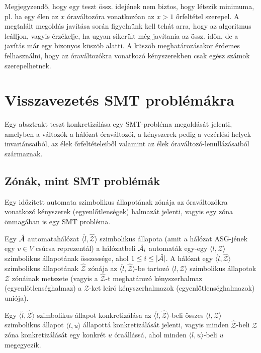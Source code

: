 Megjegyzendő, hogy egy teszt össz. idejének nem biztos, hogy létezik minimuma, pl. ha egy élen az $x$ óraváltozóra vonatkozóan az $x > 1$ őrfeltétel szerepel. A megtalált megoldás javítása során figyelnünk kell tehát arra, hogy az algoritmus leálljon, vagyis érzékelje, ha ugyan sikerült még javítania az össz. időn, de a javítás már egy bizonyos küszöb alatti. A küszöb meghatározásakor érdemes felhasználni, hogy az óraváltozókra vonatkozó kényszerekben csak egész számok szerepelhetnek.

\section{Visszavezetés SMT problémákra} \label{teszt-smt}

Egy absztrakt teszt konkretizálása egy SMT-probléma megoldását jelenti, amelyben a változók a hálózat óraváltozói, a kényszerek pedig a vezérlési helyek invariánsaiból, az élek őrfeltételeiből valamint az élek óraváltozó-lenullázásaiból származnak.

\subsection{Zónák, mint SMT problémák}

Egy időzített automata szimbolikus állapotának zónája az óraváltozókra vonatkozó kényszerek (egyenlőtlenségek) halmazát jelenti, vagyis egy zóna önmagában is egy SMT probléma.

Egy $\hat{\mathcal{A}}$ automatahálózat $\langle \hat{l}, \hat{\mathcal{Z}} \rangle$ szimbolikus állapota (amit a hálózat ASG-jének egy $v \in V$ csúcsa reprezentál) a hálózatbeli $\hat{\mathcal{A}}_i$ automaták egy-egy $\langle l, \mathcal{Z} \rangle$ szimbolikus állapotának összessége, ahol $1 \leq i \leq |\hat{\mathcal{A}}|$. A hálózat egy $\langle \hat{l}, \hat{\mathcal{Z}} \rangle$ szimbolikus állapotának $\hat{\mathcal{Z}}$ zónája az $\langle \hat{l}, \hat{\mathcal{Z}} \rangle$-be tartozó $\langle l, \mathcal{Z} \rangle$ szimbolikus állapotok $\mathcal{Z}$ zónáinak metszete (vagyis a $\hat{\mathcal{Z}}$-t meghatározó kényszerhalmaz (egyenlőtlenséghalmaz) a $\mathcal{Z}$-ket leíró kényszerhalmazok (egyenlőtlenséghalmazok) uniója).

Egy $\langle \hat{l}, \hat{\mathcal{Z}} \rangle$ szimbolikus állapot konkretizálása az $\langle \hat{l}, \hat{\mathcal{Z}} \rangle$-beli összes $\langle l, \mathcal{Z} \rangle$ szimbolikus állapot $\langle l, u \rangle$ állapottá konkretizálását jelenti, vagyis minden $\hat{\mathcal{Z}}$-beli $\mathcal{Z}$ zóna konkretizálását egy konkrét $u$ óraállássá, ahol minden $\langle l, u \rangle$-beli $u$ megegyezik.

